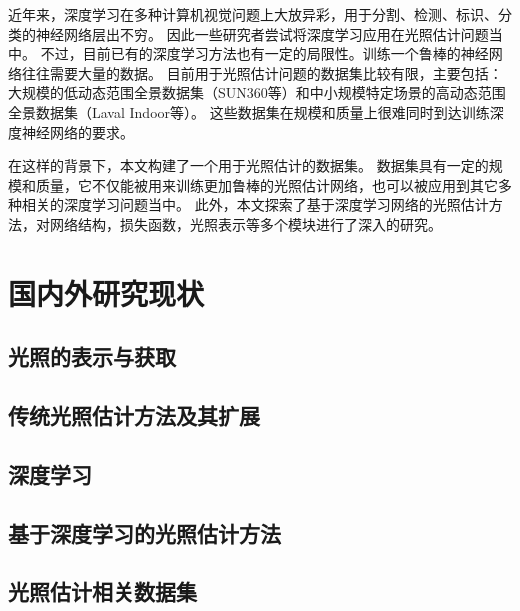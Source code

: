 近年来，深度学习在多种计算机视觉问题上大放异彩，用于分割、检测、标识、分类的神经网络层出不穷。
因此一些研究者尝试将深度学习应用在光照估计问题当中。
不过，目前已有的深度学习方法也有一定的局限性。训练一个鲁棒的神经网络往往需要大量的数据。
目前用于光照估计问题的数据集比较有限，主要包括：
大规模的低动态范围全景数据集（SUN360等）和中小规模特定场景的高动态范围全景数据集（Laval Indoor等）。
这些数据集在规模和质量上很难同时到达训练深度神经网络的要求。

在这样的背景下，本文构建了一个用于光照估计的数据集。
数据集具有一定的规模和质量，它不仅能被用来训练更加鲁棒的光照估计网络，也可以被应用到其它多种相关的深度学习问题当中。
此外，本文探索了基于深度学习网络的光照估计方法，对网络结构，损失函数，光照表示等多个模块进行了深入的研究。

\section{国内外研究现状}
\subsection{光照的表示与获取}
\subsection{传统光照估计方法及其扩展}
\subsection{深度学习}
\subsection{基于深度学习的光照估计方法}
\subsection{光照估计相关数据集}
